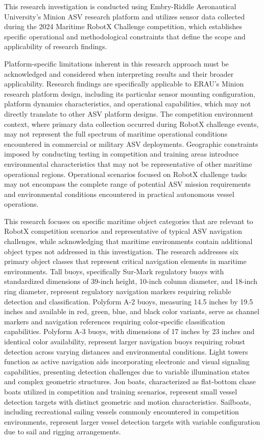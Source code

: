 \documentclass{erauthesis}
\begin{document}
This research investigation is conducted using Embry-Riddle Aeronautical University's Minion ASV research platform and utilizes sensor data collected during the 2024 Maritime RobotX Challenge competition, which establishes specific operational and methodological constraints that define the scope and applicability of research findings.

Platform-specific limitations inherent in this research approach must be acknowledged and considered when interpreting results and their broader applicability. Research findings are specifically applicable to ERAU's Minion research platform design, including its particular sensor mounting configuration, platform dynamics characteristics, and operational capabilities, which may not directly translate to other ASV platform designs. The competition environment context, where primary data collection occurred during RobotX challenge events, may not represent the full spectrum of maritime operational conditions encountered in commercial or military ASV deployments. Geographic constraints imposed by conducting testing in competition and training areas introduce environmental characteristics that may not be representative of other maritime operational regions. Operational scenarios focused on RobotX challenge tasks may not encompass the complete range of potential ASV mission requirements and environmental conditions encountered in practical autonomous vessel operations.

This research focuses on specific maritime object categories that are relevant to RobotX competition scenarios and representative of typical ASV navigation challenges, while acknowledging that maritime environments contain additional object types not addressed in this investigation. The research addresses six primary object classes that represent critical navigation elements in maritime environments. Tall buoys, specifically Sur-Mark regulatory buoys with standardized dimensions of 39-inch height, 10-inch column diameter, and 18-inch ring diameter, represent regulatory navigation markers requiring reliable detection and classification. Polyform A-2 buoys, measuring 14.5 inches by 19.5 inches and available in red, green, blue, and black color variants, serve as channel markers and navigation references requiring color-specific classification capabilities. Polyform A-3 buoys, with dimensions of 17 inches by 23 inches and identical color availability, represent larger navigation buoys requiring robust detection across varying distances and environmental conditions. Light towers function as active navigation aids incorporating electronic and visual signaling capabilities, presenting detection challenges due to variable illumination states and complex geometric structures. Jon boats, characterized as flat-bottom chase boats utilized in competition and training scenarios, represent small vessel detection targets with distinct geometric and motion characteristics. Sailboats, including recreational sailing vessels commonly encountered in competition environments, represent larger vessel detection targets with variable configuration due to sail and rigging arrangements.
\end{document}
